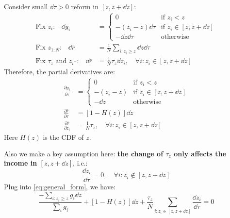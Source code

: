 Consider small $\dd\tau>0$ reform in $[z,z+\dd z]$:
\begin{align*}
    \text{Fix $z_i$:} \quad \dd y_i &= \begin{cases}
      0 & \text{if $z_i < z$}\\
      -(z_i-z)\dd\tau & \text{if $z_i \in [z,z+\dd z]$}\\
      - \dd z\dd\tau & \text{otherwise}
    \end{cases} \\
    \text{Fix $z_{1:N}$:} \quad \dd\bar{r} &= \frac{1}{N}\sum_{i:z_i\geq z}\dd z\dd\tau \\
    \text{Fix $\tau_z$ and $z_{i^-}$:} \quad \dd\bar{r} &= \frac{1}{N}\tau_z\dd z_i, \quad \forall i: z_i \in [z,z+\dd z]
\end{align*}
Therefore, the partial derivatives are:
\begin{align*}
    \frac{\partial y_i}{\partial \tau} &= \begin{cases}
      0 & \text{if $z_i < z$}\\
      -(z_i-z) & \text{if $z_i \in [z,z+\dd z]$}\\
      - \dd z & \text{otherwise}
    \end{cases} \\
    \frac{\partial \bar{r}}{\partial \tau} &= [1-H(z)]\dd z \\
    \frac{\partial \bar{r}}{\partial z_i} &= \frac{1}{N}\tau_z, \quad \forall i: z_i \in [z,z+\dd z]
\end{align*}
Here $H(z)$ is the CDF of $z$.

Also we make a key assumption here: \textbf{the change of $\tau_z$ only affects the income in $[z,z+\dd z]$}, i.e.:
\begin{equation*}
    \frac{\dd z_i}{\dd \tau} = 0, \quad \forall i: z_i \not\in [z,z+\dd z] 
\end{equation*}
Plug into \eqref{eq:general_form}, we have:
\begin{equation} \label{eq:nl_income_form}
    \frac{-\sum_{i:z_i\geq z} g_i\dd z}{\sum_i g_i}  +  [1-H(z)]\dd z + \frac{\tau_z}{N}\sum_{i:z_i \in [z,z+\dd z]} \frac{\dd z_i}{\dd \tau} = 0
\end{equation}

